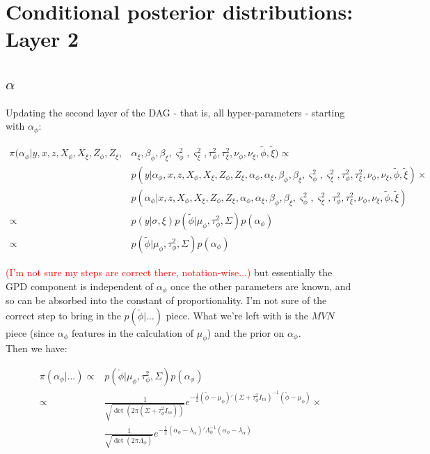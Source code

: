 \documentclass{article}
\begin{document}
\section{Conditional posterior distributions: Layer 2}

\subsection{$\alpha$}

Updating the second layer of the DAG - that is, all hyper-parameters - starting with $\alpha_\phi$:

\begin{align*}
\pi(\alpha_\phi | y, x, z, X_\phi, X_\xi, Z_\phi, Z_\xi, & \alpha_\xi, \beta_\phi, \beta_\xi, \varsigma^2_\phi, \varsigma^2_\xi, \tau^2_\phi, \tau^2_\xi, \nu_\phi, \nu_\xi, \tilde{\phi}, \tilde{\xi}) \propto \\
& p(y | \alpha_\phi, x, z, X_\phi, X_\xi, Z_\phi, Z_\xi, \alpha_\phi, \alpha_\xi, \beta_\phi, \beta_\xi, \varsigma^2_\phi, \varsigma^2_\xi, \tau^2_\phi, \tau^2_\xi, \nu_\phi, \nu_\xi, \tilde{\phi}, \tilde{\xi}) \times \\
& p(\alpha_\phi | x, z, X_\phi, X_\xi, Z_\phi, Z_\xi, \alpha_\phi, \alpha_\xi, \beta_\phi, \beta_\xi, \varsigma^2_\phi, \varsigma^2_\xi, \tau^2_\phi, \tau^2_\xi, \nu_\phi, \nu_\xi, \tilde{\phi}, \tilde{\xi}) \\
\propto & p(y | \sigma, \xi)  p(\tilde{\phi} | \mu_\phi, \tau^2_\phi, \Sigma) p(\alpha_\phi) \\
\propto & p(\tilde{\phi} | \mu_\phi, \tau^2_\phi, \Sigma) p(\alpha_\phi)
\end{align*}

\textcolor{red}{(I'm not sure my steps are correct there, notation-wise...)} but essentially the GPD component is independent of $\alpha_\phi$ once the other parameters are known, and so can be absorbed into the constant of proportionality. I'm not sure of the correct step to bring in the $p(\tilde{\phi} | \dots )$ piece. What we're left with is the $MVN$ piece (since $\alpha_\phi$ features in the calculation of $\mu_\phi$) and the prior on $\alpha_\phi$. \\

Then we have:

\begin{align*}
\pi(\alpha_\phi | \dots ) \propto & p(\tilde{\phi} | \mu_\phi, \tau^2_\phi, \Sigma) p(\alpha_\phi) \\
\propto & \frac{1}{\sqrt{\det(2 \pi (\Sigma + \tau^2_\phi I_m))}} e^{-\frac{1}{2} (\tilde{\phi} - \mu_\phi)' (\Sigma + \tau^2_\phi I_m)^{-1} (\tilde{\phi} - \mu_\phi) } \times \\
& \frac{1}{\sqrt{\det(2 \pi \Lambda_\phi)}} e^{-\frac{1}{2} (\alpha_\phi - \lambda_\alpha)' \Lambda_\phi^{-1} (\alpha_\phi - \lambda_\alpha) }
\end{align*}
\end{document}
